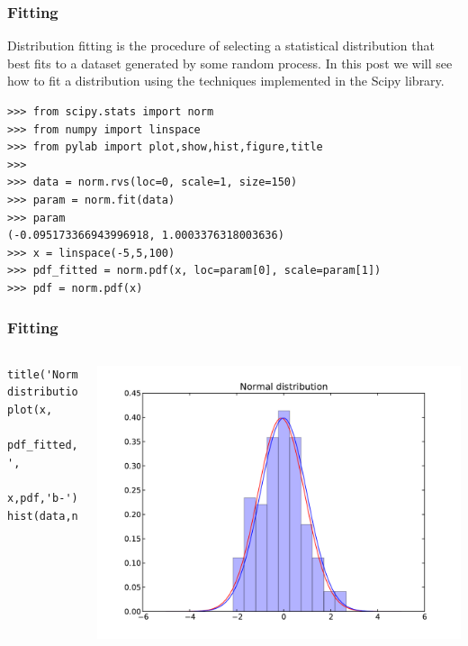 \documentclass[10pt,colorlinks]{beamer}
\begin{document}
\begin{frame}[fragile]\frametitle{Fitting}
    Distribution fitting is the procedure of selecting a statistical distribution that best fits to a dataset generated by some random process. In this post we will see how to fit a distribution using the techniques implemented in the Scipy library. 

\small
\begin{verbatim}
>>> from scipy.stats import norm
>>> from numpy import linspace
>>> from pylab import plot,show,hist,figure,title
>>> 
>>> data = norm.rvs(loc=0, scale=1, size=150) 
>>> param = norm.fit(data)
>>> param
(-0.095173366943996918, 1.0003376318003636)
>>> x = linspace(-5,5,100)
>>> pdf_fitted = norm.pdf(x, loc=param[0], scale=param[1])
>>> pdf = norm.pdf(x)
\end{verbatim}

 
\end{frame}
\begin{frame}[fragile]\frametitle{Fitting}

\begin{columns}[c]
\begin{verbatim}
title('Normal distribution')
plot(x,
    pdf_fitted,'r-',
    x,pdf,'b-')
hist(data,normed=1,alpha=.3)
\end{verbatim}

%
\includegraphics[width=\textwidth]{plwfigis/CursP_3_figure16}

\end{columns}    
\end{frame}
\end{document}
